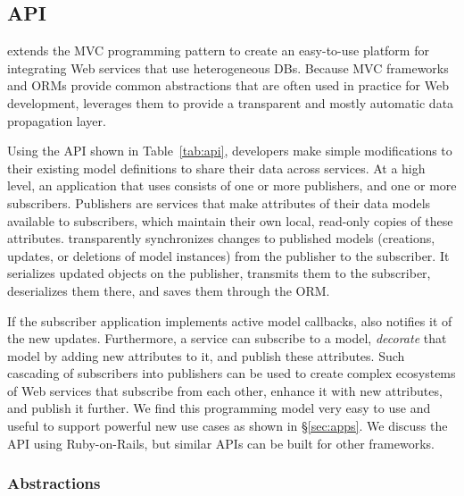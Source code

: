 \setlength{\tabcolsep}{4pt}
\subsection{\synapse API}
\label{sec:programming-model}

\synapse extends the MVC programming pattern to create an
easy-to-use platform for integrating Web services that use
heterogeneous DBs.  
Because MVC frameworks and ORMs provide common abstractions that are
often used in practice for Web development, \synapse
leverages them to provide a transparent and mostly automatic data
propagation layer.

Using the \synapse API shown in Table~\ref{tab:api}, developers make
simple modifications to their existing model definitions to share their data
across services. At a high
level, an application that uses \synapse consists of one or more publishers,
and one or more subscribers. Publishers are services that make attributes of
their data models available to subscribers, which maintain their own local,
read-only copies of these attributes. \synapse transparently
synchronizes changes to published models (creations, updates, or deletions of
model instances) from the publisher to the subscriber.  It serializes
updated objects on the publisher, transmits them to the subscriber, deserializes
them there, and saves them through the ORM.

If the subscriber application implements active model callbacks,
\synapse also notifies it of the new updates.  Furthermore, a service can
subscribe to a model, \emph{decorate} that model by adding new
attributes to it, and publish these attributes. Such cascading
of subscribers into publishers can be used to create complex
ecosystems of Web services that subscribe from each other, enhance it
with new attributes, and publish it further.  We find this
programming model very easy to use and useful to support powerful new use
cases as shown in \S\ref{sec:apps}.
We discuss the \synapse API using Ruby-on-Rails, but similar APIs can be
built for other frameworks.

\subsubsection{\synapse Abstractions}
\label{sec:api}

\begingroup
\setlength{\columnsep}{6pt}

